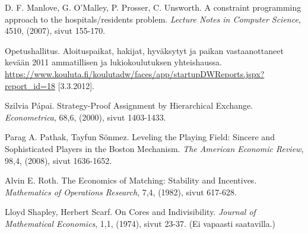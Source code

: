 \documentclass[twoside]{tktltiki}
\begin{document}
\begin{thebibliography}{XXX99}
  D. F. Manlove, G. O'Malley, P. Prosser, C. Unsworth.
  A constraint programming approach to the hospitals/residents
  problem.
  \emph{Lecture Notes in Computer Science}, 4510, (2007), sivut 155-170.

  Opetushallitus.
  Aloituspaikat, hakijat, hyväksytyt ja paikan vastaanottaneet
  kevään 2011 ammatillisen ja lukiokoulutuksen yhteishaussa.\\
  \url{https://www.kouluta.fi/koulutadw/faces/app/startupDWReports.jspx?report_id=18}
  [3.3.2012].

  Szilvia Pápai.
  Strategy-Proof Assignment by Hierarchical Exchange.
  \emph{Econometrica}, 68,6, (2000), sivut 1403-1433.

  Parag A. Pathak, Tayfun Sönmez.
  Leveling the Playing Field: Sincere and Sophisticated Players in the
  Boston Mechanism.
  \emph{The American Economic Review}, 98,4, (2008), sivut 1636-1652.

  Alvin E. Roth.
  The Economics of Matching: Stability and Incentives.
  \emph{Mathematics of Operations Research}, 7,4, (1982), sivut 617-628.

  Lloyd Shapley, Herbert Scarf.
  On Cores and Indivisibility.
  \emph{Journal of Mathematical Economics}, 1,1, (1974), sivut 23-37.
  (Ei vapaasti saatavilla.)

\end{thebibliography}
\lastpage
\end{document}
